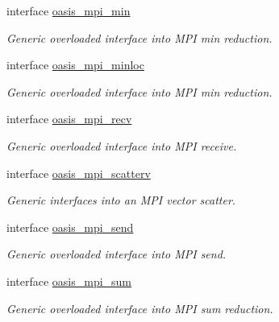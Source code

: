 \begin{DoxyCompactItemize}
interface \hyperlink{interfacemod__oasis__mpi_1_1oasis__mpi__min}{oasis\+\_\+mpi\+\_\+min}
\begin{DoxyCompactList}\small\item\em Generic overloaded interface into M\+PI min reduction. \end{DoxyCompactList}\item 
interface \hyperlink{interfacemod__oasis__mpi_1_1oasis__mpi__minloc}{oasis\+\_\+mpi\+\_\+minloc}
\begin{DoxyCompactList}\small\item\em Generic overloaded interface into M\+PI min reduction. \end{DoxyCompactList}\item 
interface \hyperlink{interfacemod__oasis__mpi_1_1oasis__mpi__recv}{oasis\+\_\+mpi\+\_\+recv}
\begin{DoxyCompactList}\small\item\em Generic overloaded interface into M\+PI receive. \end{DoxyCompactList}\item 
interface \hyperlink{interfacemod__oasis__mpi_1_1oasis__mpi__scatterv}{oasis\+\_\+mpi\+\_\+scatterv}
\begin{DoxyCompactList}\small\item\em Generic interfaces into an M\+PI vector scatter. \end{DoxyCompactList}\item 
interface \hyperlink{interfacemod__oasis__mpi_1_1oasis__mpi__send}{oasis\+\_\+mpi\+\_\+send}
\begin{DoxyCompactList}\small\item\em Generic overloaded interface into M\+PI send. \end{DoxyCompactList}\item 
interface \hyperlink{interfacemod__oasis__mpi_1_1oasis__mpi__sum}{oasis\+\_\+mpi\+\_\+sum}
\begin{DoxyCompactList}\small\item\em Generic overloaded interface into M\+PI sum reduction. \end{DoxyCompactList}\end{DoxyCompactItemize}
